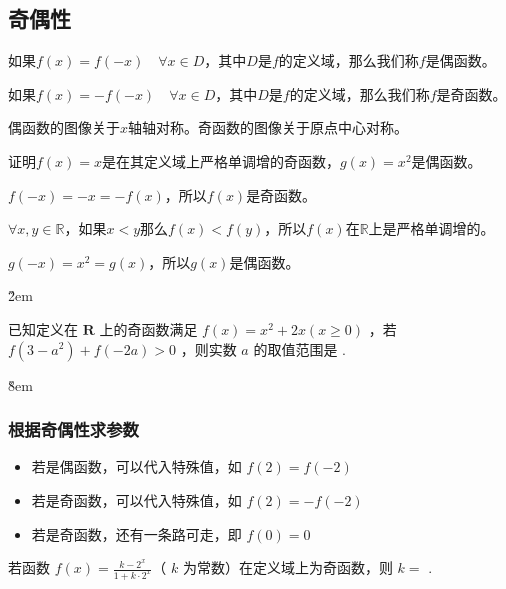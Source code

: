 \subsection{奇偶性}

\begin{definition}[奇偶性]
    如果$f(x)=f(-x)\quad \forall x\in D$，其中$D$是$f$的定义域，那么我们称$f$是偶函数。

    如果$f(x)=-f(-x)\quad \forall x\in D$，其中$D$是$f$的定义域，那么我们称$f$是奇函数。

    偶函数的图像关于$x$轴轴对称。奇函数的图像关于原点中心对称。
\end{definition}

\begin{exercise}
    证明$f(x)=x$是在其定义域上严格单调增的奇函数，$g(x)=x^2$是偶函数。
\end{exercise}

\begin{solution}
    $f(-x)=-x=-f(x)$，所以$f(x)$是奇函数。

    $\forall x,y\in \mathbb{R}$，如果$x<y$那么$f(x)<f(y)$，所以$f(x)$在$\mathbb{R}$上是严格单调增的。

    $g(-x)=x^2=g(x)$，所以$g(x)$是偶函数。
\end{solution}

\v{2em}

\begin{example}
    已知定义在 $\mathbf{R}$ 上的奇函数满足 $f(x)=x^2+2 x(x \geq 0)$ ，若 $f\left(3-a^2\right)+f(-2 a)>0$ ，则实数 $a$ 的取值范围是 \underline{\qquad}.
\end{example}

\v{8em}

\subsubsection{根据奇偶性求参数}

\begin{theorem}
    \begin{itemize}
        \item 若是偶函数，可以代入特殊值，如 $f(2) = f(-2)$
        \item 若是奇函数，可以代入特殊值，如 $f(2) = -f(-2)$
        \item 若是奇函数，还有一条路可走，即 $f(0) = 0$
    \end{itemize}
\end{theorem}

\begin{example}
    若函数 $f(x)=\frac{k-2^x}{1+k \cdot 2^x}$（ $k$ 为常数）在定义域上为奇函数，则 $k=$ \underline{\qquad}.
\end{example}

